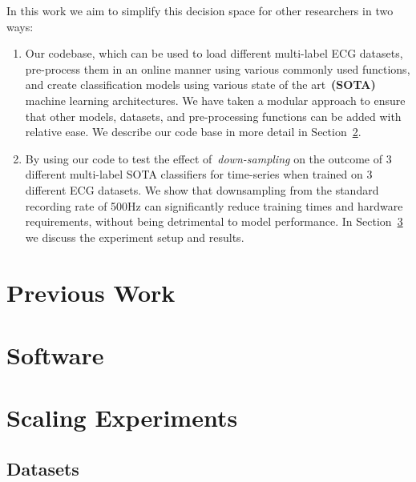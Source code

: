 \documentclass[pmlr,twocolumn]{jmlr}%
\begin{document}
In this work we aim to simplify this decision space for other researchers in two ways: 
\begin{enumerate}
    \item Our codebase, which can be used to load different multi-label ECG datasets, pre-process them in an online manner using various commonly used functions, and create classification models using various state of the art~\textbf{(SOTA)} machine learning architectures. We have taken a modular approach to ensure that other models, datasets, and pre-processing functions can be added with relative ease. We describe our code base in more detail in Section~\ref{sec:software}.
    \item By using our code to test the effect of~\textit{down-sampling} on the outcome of 3 different multi-label SOTA classifiers for time-series when trained on 3 different ECG datasets. We show that downsampling from the standard recording rate of 500Hz can significantly reduce training times and hardware requirements, without being detrimental to model performance. In Section~\ref{sec:experiment} we discuss the experiment setup and results.
\end{enumerate}

\section{Previous Work}
\label{sec:prevwork}

\section{Software}
\label{sec:software}


\section{Scaling Experiments}
\label{sec:experiment}
\subsection{Datasets}



\end{document}

